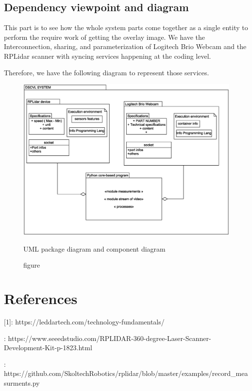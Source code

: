       
  
      
  \subsection{Dependency viewpoint and diagram}
  This part is to see how the whole system parts come together as a single entity to perform the require work of getting the overlay image. We have the Interconnection, sharing, and
parameterization of Logitech Brio Webcam and the RPLidar scanner with syncing services happening at the  coding level.

Therefore, we have the following diagram to represent those services.

	\begin{figure}[ht]
			
    \centering \includegraphics[scale=.5]{images/diagrampackages.eps}
    	\caption{figure}{ UML package diagram and component diagram} 
    	\end{figure}



      
      \section{References}
[1]: {https://leddartech.com/technology-fundamentals/}   \par	
[2]: {https://www.seeedstudio.com/RPLIDAR-360-degree-Laser-Scanner-Development-Kit-p-1823.html}\par
[3]: {https://github.com/SkoltechRobotics/rplidar/blob/master/examples/record\_measurments.py}
 
